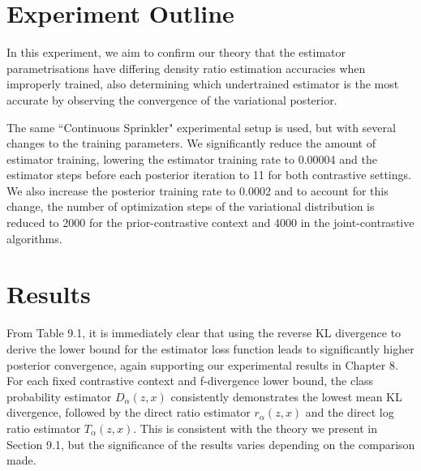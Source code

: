 \documentclass[honours,12pt]{unswthesis}
\numberwithin{equation}{section}
\theoremstyle{definition}
\begin{document}
\section{Experiment Outline}
In this experiment, we aim to confirm our theory that the estimator parametrisations have differing density ratio estimation accuracies when improperly trained, also determining which undertrained estimator is the most accurate by observing the convergence of the variational posterior.

The same ``Continuous Sprinkler" experimental setup is used, but with several changes to the training parameters. We significantly reduce the amount of estimator training, lowering the estimator training rate to 0.00004 and the estimator steps before each posterior iteration to 11 for both contrastive settings. We also increase the posterior training rate to 0.0002 and to account for this change, the number of optimization steps of the variational distribution is reduced to 2000 for the prior-contrastive context and 4000 in the joint-contrastive algorithms. 
\section{Results}
From Table 9.1, it is immediately clear that using the reverse KL divergence to derive the lower bound for the estimator loss function leads to significantly higher posterior convergence, again supporting our experimental results in Chapter 8. For each fixed contrastive context and f-divergence lower bound, the class probability estimator $D_\alpha(z,x)$ consistently demonstrates the lowest mean KL divergence, followed by the direct ratio estimator $r_\alpha (z,x)$ and the direct log ratio estimator $T_\alpha(z,x)$. This is consistent with the theory we present in Section 9.1, but the significance of the results varies depending on the comparison made.
\end{document}
